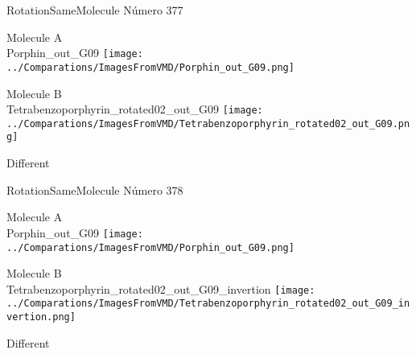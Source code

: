 \vtab[-2cm]
\begin{center}
{\large RotationSameMolecule \tab Número 377}
\end{center}
\begin{multicols}{2}
\begin{center}
Molecule A \\ 
Porphin\_out\_G09
\texttt{[image: ../Comparations/ImagesFromVMD/Porphin\_out\_G09.png]}
\\
\vtab

\columnbreak
Molecule B \\ 
Tetrabenzoporphyrin\_rotated02\_out\_G09
\texttt{[image: ../Comparations/ImagesFromVMD/Tetrabenzoporphyrin\_rotated02\_out\_G09.png]}
\\
\vtab


\end{center}
\end{multicols}
\begin{center}
\vtab
\vtab
\textcolor{NavyBlue}{\Large Different}
\end{center}

 \newpage

\vtab[-2cm]
\begin{center}
{\large RotationSameMolecule \tab Número 378}
\end{center}
\begin{multicols}{2}
\begin{center}
Molecule A \\ 
Porphin\_out\_G09
\texttt{[image: ../Comparations/ImagesFromVMD/Porphin\_out\_G09.png]}
\\
\vtab

\columnbreak
Molecule B \\ 
Tetrabenzoporphyrin\_rotated02\_out\_G09\_invertion
\texttt{[image: ../Comparations/ImagesFromVMD/Tetrabenzoporphyrin\_rotated02\_out\_G09\_invertion.png]}
\\
\vtab


\end{center}
\end{multicols}
\begin{center}
\vtab
\vtab
\textcolor{NavyBlue}{\Large Different}
\end{center}

 \newpage

